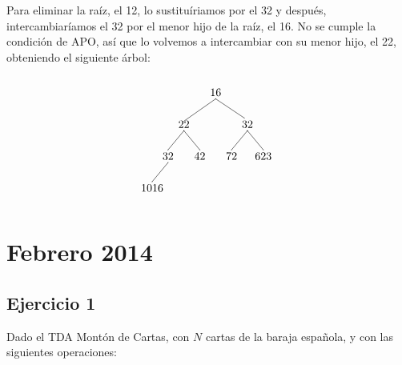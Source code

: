 \documentclass[10pt,a4paper,spanish]{report}
\begin{document}
\noindent
Para eliminar la raíz, el 12, lo sustituíriamos por el 32 y después, intercambiaríamos el 32 por el menor hijo de la raíz, el 16. No se cumple la condición de APO, así que lo volvemos a intercambiar con su menor hijo, el 22, obteniendo el siguiente árbol:

      \[\begin{xy}
      ,(0,0)*+=<10mm>[]\txt<2cm>{16}
      ,(-10,-10)*+=<10mm>[]\txt<2cm>{22}
      ,(10,-10)*+=<10mm>[]\txt<2cm>{32}
      ,(-15,-20)*+=<10mm>[]\txt<2cm>{32}
      ,(-5,-20)*+=<10mm>[]\txt<2cm>{42}
      ,(5,-20)*+=<10mm>[]\txt<2cm>{72}
      ,(15,-20)*+=<10mm>[]\txt<2cm>{623}
      ,(-20,-30)*+=<10mm>[]\txt<2cm>{1016}

      \ar@{-} (0,-2);(-10,-9) %
      \ar@{-} (0,-2);(9,-8) %
      \ar@{-} (-10,-12);(-15,-18) %
      \ar@{-} (10,-12);(5,-18)
      \ar@{-} (10,-12);(15,-18)
      \ar@{-} (-15,-22);(-20,-28)
      \ar@{-} (-10,-12);(-5,-18)
      \end{xy}\]

\section{\textcolor[rgb]{0.5,0.8,1}Febrero 2014}
\subsection{\textcolor[rgb]{0.5,0.8,1}Ejercicio 1}
\noindent
Dado el TDA Montón de Cartas, con $N$ cartas de la baraja española, y con las siguientes operaciones:
\end{document}
